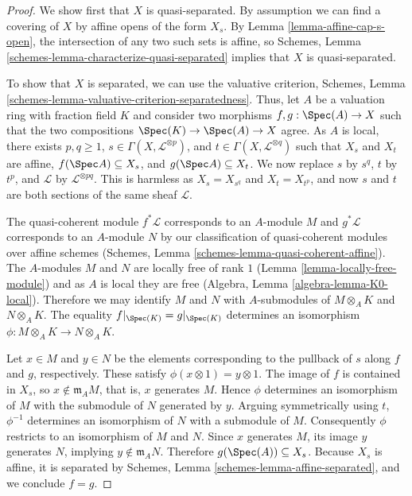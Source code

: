 \begin{proof}
We show first that $X$ is quasi-separated.  By assumption we
can find a covering of $X$ by affine opens of the form
$X_s$.  By Lemma \ref{lemma-affine-cap-s-open}, the
intersection of any two such sets is affine, so Schemes, Lemma
\ref{schemes-lemma-characterize-quasi-separated} implies
that $X$ is quasi-separated.

\medskip\noindent
To show that $X$ is separated, we can use the valuative
criterion, Schemes, Lemma
\ref{schemes-lemma-valuative-criterion-separatedness}.
Thus, let $A$ be a valuation ring with fraction field $K$
and consider two morphisms $f, g : \Spec(A) \to X$ such that
the two compositions $\Spec(K) \to \Spec(A) \to X$ agree.
As $A$ is local, there exists $p, q \ge 1$, $s \in \Gamma(X,
\mathcal{L}^{\otimes p})$, and $t \in \Gamma(X,
\mathcal{L}^{\otimes q})$ such that $X_s$ and $X_t$ are
affine, $f(\Spec A) \subseteq X_s$, and $g(\Spec A)
\subseteq X_t$.  We now replace $s$ by $s^q$, $t$ by $t^p$,
and $\mathcal{L}$ by $\mathcal{L}^{\otimes pq}$.  This is
harmless as $X_s = X_{s^q}$ and $X_t = X_{t^p}$, and now $s$
and $t$ are both sections of the same sheaf $\mathcal{L}$.

\medskip\noindent
The quasi-coherent module $f^*\mathcal{L}$ corresponds to an $A$-module $M$ and
$g^*\mathcal{L}$ corresponds to an $A$-module $N$ by our
classification of quasi-coherent modules over affine schemes
(Schemes, Lemma \ref{schemes-lemma-quasi-coherent-affine}).
The $A$-modules $M$ and $N$ are locally free of rank
$1$ (Lemma \ref{lemma-locally-free-module}) and as $A$ is
local they are free (Algebra, Lemma
\ref{algebra-lemma-K0-local}).  Therefore we may identify
$M$ and $N$ with $A$-submodules of $M \otimes_A K$ and $N
\otimes_A K$.  The equality $f|_{\Spec(K)} = g|_{\Spec(K)}$
determines an isomorphism $\phi \colon M \otimes_A K \to N
\otimes_A K$.

\medskip\noindent
Let $x \in M$ and $y \in N$ be the elements corresponding to
the pullback of $s$ along $f$ and $g$, respectively.  These
satisfy $\phi(x \otimes 1) = y \otimes 1$.  The image of $f$
is contained in $X_s$, so $x \not\in \mathfrak{m}_A M$, that
is, $x$ generates $M$.  Hence $\phi$ determines an
isomorphism of $M$ with the submodule of $N$ generated by
$y$.  Arguing symmetrically using $t$, $\phi^{-1}$
determines an isomorphism of $N$ with a submodule of $M$.
Consequently $\phi$ restricts to an isomorphism of $M$ and
$N$.  Since $x$ generates $M$, its image $y$ generates
$N$, implying $y \not\in \mathfrak{m}_A N$.  Therefore
$g(\Spec(A)) \subseteq X_s$.  Because $X_s$ is affine, it is
separated by Schemes, Lemma \ref{schemes-lemma-affine-separated},
and we conclude $f = g$.
\end{proof}

